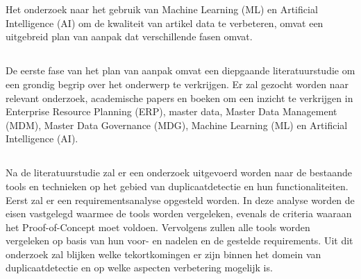 
\chapter{}%
\label{ch:methodologie}

Het onderzoek naar het gebruik van Machine Learning (ML) en Artificial Intelligence (AI) om de kwaliteit van artikel data te verbeteren, omvat een uitgebreid plan van aanpak dat verschillende fasen omvat.

\section{}%
\label{sec:LiteratuurstudieM}
De eerste fase van het plan van aanpak omvat een diepgaande literatuurstudie om een grondig begrip over het onderwerp te verkrijgen. Er zal gezocht worden naar relevant onderzoek, academische papers en boeken om een inzicht te verkrijgen in Enterprise Resource Planning (ERP), master data, Master Data Management (MDM), Master Data Governance (MDG), Machine Learning (ML) en Artificial Intelligence (AI).

\section{}%
\label{sec:OnderzoekM}
Na de literatuurstudie zal er een onderzoek uitgevoerd worden naar de bestaande tools en technieken op het gebied van duplicaatdetectie en hun functionaliteiten. Eerst zal er een requirementsanalyse opgesteld worden. In deze analyse worden de eisen vastgelegd waarmee de tools worden vergeleken, evenals de criteria waaraan het Proof-of-Concept moet voldoen. Vervolgens zullen alle tools worden vergeleken op basis van hun voor- en nadelen en de gestelde requirements. Uit dit onderzoek zal blijken welke tekortkomingen er zijn binnen het domein van duplicaatdetectie en op welke aspecten verbetering mogelijk is.

